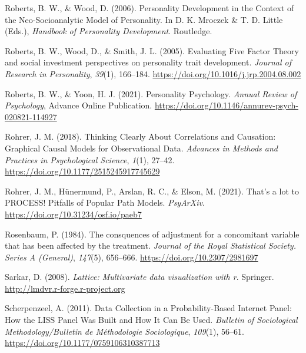 \documentclass[
  english,
  man,floatsintext]{apa7}
\begin{document}
\leavevmode\hypertarget{ref-robertsPersonalityDevelopmentContext2006}{}%
Roberts, B. W., \& Wood, D. (2006). Personality Development in the Context of the Neo-Socioanalytic Model of Personality. In D. K. Mroczek \& T. D. Little (Eds.), \emph{Handbook of Personality Development}. Routledge.

\leavevmode\hypertarget{ref-robertsEvaluatingFiveFactor2005}{}%
Roberts, B. W., Wood, D., \& Smith, J. L. (2005). Evaluating Five Factor Theory and social investment perspectives on personality trait development. \emph{Journal of Research in Personality}, \emph{39}(1), 166--184. \url{https://doi.org/10.1016/j.jrp.2004.08.002}

\leavevmode\hypertarget{ref-robertsPersonalityPsychology2021}{}%
Roberts, B. W., \& Yoon, H. J. (2021). Personality Psychology. \emph{Annual Review of Psychology}, Advance Online Publication. \url{https://doi.org/10.1146/annurev-psych-020821-114927}

\leavevmode\hypertarget{ref-rohrerThinkingClearlyCorrelations2018}{}%
Rohrer, J. M. (2018). Thinking Clearly About Correlations and Causation: Graphical Causal Models for Observational Data. \emph{Advances in Methods and Practices in Psychological Science}, \emph{1}(1), 27--42. \url{https://doi.org/10.1177/2515245917745629}

\leavevmode\hypertarget{ref-rohrerThatLotPROCESS2021}{}%
Rohrer, J. M., Hünermund, P., Arslan, R. C., \& Elson, M. (2021). That's a lot to PROCESS! Pitfalls of Popular Path Models. \emph{PsyArXiv}. \url{https://doi.org/10.31234/osf.io/paeb7}

\leavevmode\hypertarget{ref-rosenbaumConsquencesAdjustmentConcomitant1984}{}%
Rosenbaum, P. (1984). The consquences of adjustment for a concomitant variable that has been affected by the treatment. \emph{Journal of the Royal Statistical Society. Series A (General)}, \emph{147}(5), 656--666. \url{https://doi.org/10.2307/2981697}

\leavevmode\hypertarget{ref-R-lattice}{}%
Sarkar, D. (2008). \emph{Lattice: Multivariate data visualization with r}. Springer. \url{http://lmdvr.r-forge.r-project.org}

\leavevmode\hypertarget{ref-scherpenzeelDataCollectionProbabilityBased2011}{}%
Scherpenzeel, A. (2011). Data Collection in a Probability-Based Internet Panel: How the LISS Panel Was Built and How It Can Be Used. \emph{Bulletin of Sociological Methodology/Bulletin de Méthodologie Sociologique}, \emph{109}(1), 56--61. \url{https://doi.org/10.1177/0759106310387713}
\end{document}
